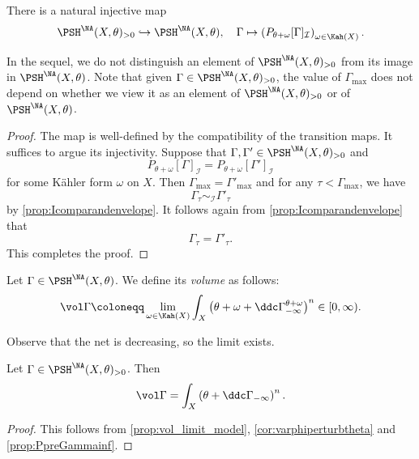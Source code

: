 \begin{proposition}\label{prop:NAposNAemb}
    There is a natural injective map
    \[
        \PSH^{\NA}(X,\theta)_{>0}\hookrightarrow \PSH^{\NA}(X,\theta),\quad \Gamma\mapsto \left(P_{\theta+\omega}[\Gamma]_{\mathcal{I}}\right)_{\omega\in \Kah(X)}.
    \]
\end{proposition}
In the sequel, we do not distinguish an element of $\PSH^{\NA}(X,\theta)_{>0}$ from its image in $\PSH^{\NA}(X,\theta)$. Note that given $\Gamma\in \PSH^{\NA}(X,\theta)_{>0}$, the value of $\Gamma_{\max}$ does not depend on whether we view it as an element of $\PSH^{\NA}(X,\theta)_{>0}$ or of $\PSH^{\NA}(X,\theta)$.
\begin{proof}
    The map is well-defined by the compatibility of the transition maps. It suffices to argue its injectivity. Suppose that $\Gamma,\Gamma'\in \PSH^{\NA}(X,\theta)_{>0}$ and
    \[
        P_{\theta+\omega}[\Gamma]_{\mathcal{I}}=P_{\theta+\omega}[\Gamma']_{\mathcal{I}}
    \]
    for some K\"ahler form $\omega$ on $X$. Then $\Gamma_{\max}=\Gamma'_{\max}$ and
    for any $\tau<\Gamma_{\max}$, we have
    \[
        \Gamma_{\tau}\sim_{\mathcal{I}}\Gamma'_{\tau}
    \]
    by \cref{prop:Icomparandenvelope}. It follows again from \cref{prop:Icomparandenvelope} that
    \[
    \Gamma_{\tau}=\Gamma'_{\tau}.
    \]
    This completes the proof.
\end{proof}


\begin{definition}\label{def:NApotential:L102}
    Let $\Gamma\in \PSH^{\NA}(X,\theta)$. We define its \emph{volume} as follows:
    \[
        \vol \Gamma\coloneqq \lim_{\omega\in \Kah(X)} \int_X \left(\theta+\omega+\ddc \Gamma^{\theta+\omega}_{-\infty}\right)^n\in [0,\infty).
    \]
    \index{$\vol \Gamma$}
\end{definition}
Observe that the net is decreasing, so the limit exists.

\begin{proposition}\label{prop:PSHNApvolGamma}
    Let $\Gamma\in \PSH^{\NA}(X,\theta)_{>0}$. Then
    \[
        \vol \Gamma=\int_X \left(\theta+\ddc \Gamma_{-\infty}\right)^n.
    \]
\end{proposition}
\begin{proof}
    This follows from \cref{prop:vol_limit_model}, \cref{cor:varphiperturbtheta} and \cref{prop:PpreGammainf}.
\end{proof}

